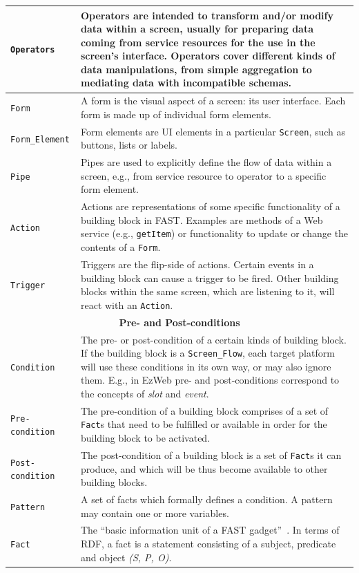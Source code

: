 \documentclass[twoside]{fast_latex}
\begin{document}
\begin{small}
\begin{longtable}{|p{4.25cm}|p{10cm}|}
\texttt{Operators} & Operators are intended to transform and/or modify data within a screen, usually for preparing data coming from service resources for the use in the screen's interface. Operators cover different kinds of data manipulations, from simple aggregation to mediating data with incompatible schemas. \\ \hline
\texttt{Form} & A form is the visual aspect of a screen: its user interface. Each form is made up of individual form elements. \\ \hline
\texttt{Form\_Element} & Form elements are UI elements in a particular \texttt{Screen}, such as buttons, lists or labels. \\ \hline
\texttt{Pipe} & Pipes are used to explicitly define the flow of data within a screen, e.g., from service resource to operator to a specific form element. \\ \hline
\texttt{Action} & Actions are representations of some specific functionality of a building block in FAST. Examples are methods of a Web service (e.g., \texttt{getItem}) or functionality to update or change the contents of a \texttt{Form}. \\ \hline
\texttt{Trigger} & Triggers are the flip-side of actions. Certain events in a building block can cause a trigger to be fired. Other building blocks within the same screen, which are listening to it, will react with an \texttt{Action}. \\ \hline
\multicolumn{2}{|c|}{\textbf{Pre- and Post-conditions}} \\ \hline
\texttt{Condition} & The pre- or post-condition of a certain kinds of building block. If the building block is a \texttt{Screen\_Flow}, each target platform will use these conditions in its own way, or may also ignore them. E.g., in EzWeb pre- and post-conditions correspond to the concepts of \emph{slot} and \emph{event}. \\ \hline
\texttt{Pre-condition} & The pre-condition of a building block comprises of a set of \texttt{Fact}s that need to be fulfilled or available in order for the building block to be activated. \\ \hline
\texttt{Post-condition} & The post-condition of a building block is a set of \texttt{Fact}s it can produce, and which will be thus become available to other building blocks. \\ \hline
\texttt{Pattern} & A set of facts which formally defines a condition. A pattern may contain one or more variables. \\ \hline
\texttt{Fact} & The ``basic information unit of a FAST gadget''~\cite{urena2010fast_architecture}. In terms of RDF, a fact is a statement consisting of a subject, predicate and object \emph{(S, P, O)}. \\ \hline

\end{longtable}
\end{small}
\end{document}
